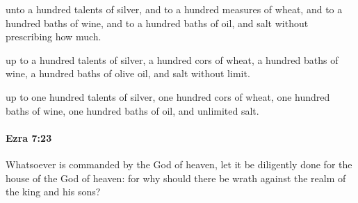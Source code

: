			\begin{versebox}
					\item[BHS] 
					\item[LXX] 
					\item[ASV] unto a hundred talents of silver, and to a hundred measures of wheat, and to a hundred baths of wine, and to a hundred baths of oil, and salt without prescribing how much.
					\item[NIV] up to a hundred talents of silver, a hundred cors of wheat, a hundred baths of wine, a hundred baths of olive oil, and salt without limit.
					\item[NRSV] up to one hundred talents of silver, one hundred cors of wheat, one hundred baths of wine, one hundred baths of oil, and unlimited salt.
			\end{versebox}

		\paragraph{Ezra 7:23} %
			\label{EZRA-7-23}

			Whatsoever is commanded by the God of heaven, let it be diligently done for the house of the God of heaven: for why should there be wrath against the realm of the king and his sons?

